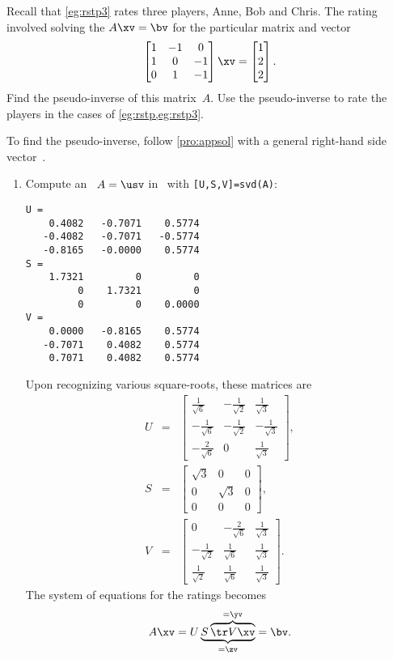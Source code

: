 \begin{example}  
Recall that \cref{eg:rstp3} rates three  players, Anne, Bob and Chris.  
The rating involved solving the  \(A\xv=\bv\) for the particular matrix and vector
\begin{equation*}
\begin{bmatrix} 1&-1&0\\1&0&-1\\0&1&-1 \end{bmatrix}\xv
=\begin{bmatrix} 1\\2\\2 \end{bmatrix}.
\end{equation*}
Find the pseudo-inverse of this matrix~\(A\).
Use the pseudo-inverse to rate the players in the cases of \cref{eg:rstp,eg:rstp3}.
\begin{solution} 
To find the pseudo-inverse, follow \cref{pro:appsol} with a general right-hand side vector~\bv.
\begin{enumerate}
\item Compute an \svd\ \(A=\usv\) in \script\ with \verb|[U,S,V]=svd(A)|:
\begin{verbatim}
U =
    0.4082   -0.7071    0.5774
   -0.4082   -0.7071   -0.5774
   -0.8165   -0.0000    0.5774
S =
    1.7321         0         0
         0    1.7321         0
         0         0    0.0000
V =
    0.0000   -0.8165    0.5774
   -0.7071    0.4082    0.5774
    0.7071    0.4082    0.5774
\end{verbatim}
Upon recognizing various square-roots, these matrices are
\begin{eqnarray*}
U&=&\begin{bmatrix} \frac1{\sqrt6}&-\frac1{\sqrt2}&\frac1{\sqrt3}
\\-\frac1{\sqrt6}&-\frac1{\sqrt2}&-\frac1{\sqrt3}
\\-\frac2{\sqrt6}&0&\frac1{\sqrt3} \end{bmatrix},
\\
S&=&\begin{bmatrix} \sqrt3&0&0
\\0&\sqrt3&0
\\0&0&0 \end{bmatrix},
\\
V&=&\begin{bmatrix} 0&-\frac2{\sqrt6}&\frac1{\sqrt3}
\\-\frac1{\sqrt2}&\frac1{\sqrt6}&\frac1{\sqrt3}
\\\frac1{\sqrt2}&\frac1{\sqrt6}&\frac1{\sqrt3} \end{bmatrix}.
\end{eqnarray*}
The system of equations for the ratings becomes
\begin{equation*}
A\xv=
U\underbrace{S\overbrace{\tr V\xv}^{=\yv}}_{=\zv}
=\bv.
\end{equation*}


\end{enumerate}
\end{solution}
\end{example}
